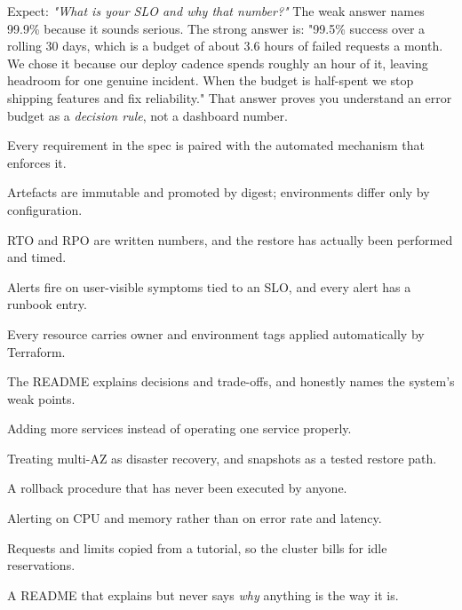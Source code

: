 \begin{interview}
Expect: \emph{"What is your SLO and why that number?"} The weak answer names 99.9\% because it sounds serious. The strong answer is: "99.5\% success over a rolling 30 days, which is a budget of about 3.6 hours of failed requests a month. We chose it because our deploy cadence spends roughly an hour of it, leaving headroom for one genuine incident. When the budget is half-spent we stop shipping features and fix reliability." That answer proves you understand an error budget as a \emph{decision rule}, not a dashboard number.
\end{interview}

\begin{bestpractices}
\begin{wbitem}
  \item Every requirement in the spec is paired with the automated mechanism that enforces it.
  \item Artefacts are immutable and promoted by digest; environments differ only by configuration.
  \item RTO and RPO are written numbers, and the restore has actually been performed and timed.
  \item Alerts fire on user-visible symptoms tied to an SLO, and every alert has a runbook entry.
  \item Every resource carries owner and environment tags applied automatically by Terraform.
  \item The README explains decisions and trade-offs, and honestly names the system's weak points.
\end{wbitem}
\end{bestpractices}
\begin{mistakes}
\begin{wbitem}
  \item Adding more services instead of operating one service properly.
  \item Treating multi-AZ as disaster recovery, and snapshots as a tested restore path.
  \item A rollback procedure that has never been executed by anyone.
  \item Alerting on CPU and memory rather than on error rate and latency.
  \item Requests and limits copied from a tutorial, so the cluster bills for idle reservations.
  \item A README that explains  but never says \emph{why} anything is the way it is.
\end{wbitem}
\end{mistakes}


